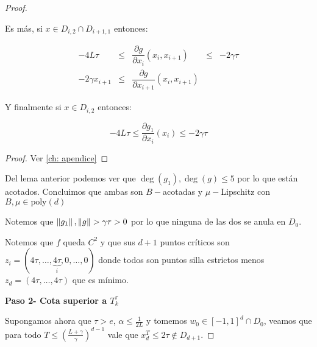 \begin{proof}
\begin{lemma}
		Es m\'as, si $x \in D_{i,2} \cap D_{i+1,1}$ entonces:
		
		\begin{equation*}
		\begin{aligned}
		-4L\tau & \leq & \dfrac{\partial g}{\partial x_i}(x_i, x_{i+1}) & \leq & -2 \gamma \tau \\
		-2\gamma x_{i+1} & \leq & \dfrac{\partial g}{\partial x_{i+1}}(x_i, x_{i+1}) & &
		\end{aligned}
		\end{equation*}
		
		Y finalmente si $x \in D_{i,2}$ entonces:
		
		\begin{equation*}
			-4L\tau \leq \dfrac{\partial g_1}{\partial x_i}(x_i)  \leq  -2 \gamma \tau 
		\end{equation*}
		
	\end{lemma}

	\begin{proof}
		Ver \ref{ch: apendice}
	\end{proof}

	\begin{remark}
		Del lema anterior podemos ver que $\deg(g_1), \deg(g) \leq 5$ por lo que est\'an acotados. Concluimos que ambas son $B-$acotadas y $\mu-$Lipschitz con $B, \mu \in \text{poly}(d)$
	\end{remark}

	\begin{remark}
		Notemos que $\left\lVert g_1\right\rVert, \left\lVert g\right\rVert > \gamma \tau > 0$ por lo que ninguna de las dos se anula en $D_0$.
	\end{remark}

	\begin{remark}
		Notemos que $f$ queda $C^2$ y que sus $d+1$ puntos cr\'iticos son $z_i = \left(4\tau, \dots, \underbrace{4\tau}_{i}, 0, \dots, 0\right)$ donde todos son puntos silla estrictos menos $z_{d} = \left(4\tau, \dots, 4\tau\right)$ que es m\'inimo.
	\end{remark}
	
	\medskip
	
	\textbf{Paso 2- Cota superior a $T_k^{\tau}$}
	
	\medskip
	
	Supongamos ahora que $\tau > e$, $\alpha \leq \frac{1}{2L}$ y tomemos $w_0 \in [-1,1]^d \cap D_0$, veamos que para todo $T \leq \left(\frac{L+ \gamma}{\gamma}\right)^{d-1}$ vale que $x_{d}^T \leq 2\tau \not \in D_{d+1}$.
	

\end{proof}
